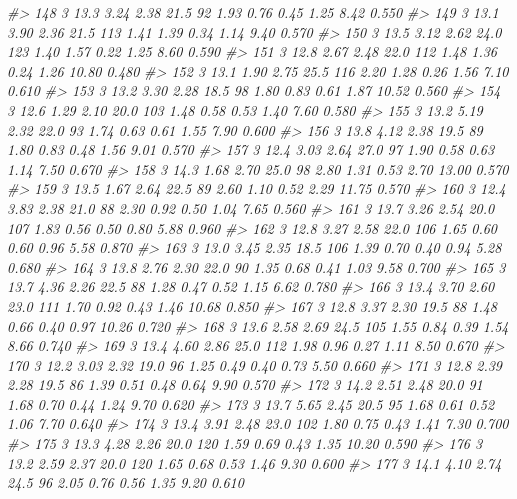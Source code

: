 \documentclass[]{book}
\newenvironment{Shaded}{\begin{snugshade}}{\end{snugshade}}
\newcommand{\CommentTok}[1]{\textcolor[rgb]{0.56,0.35,0.01}{\textit{#1}}}
\begin{document}
\begin{Shaded}
\begin{Highlighting}[]
\CommentTok{#> 148  3   13.3  3.24  2.38  21.5   92 1.93  0.76 0.45  1.25  8.42 0.550}
\CommentTok{#> 149  3   13.1  3.90  2.36  21.5  113 1.41  1.39 0.34  1.14  9.40 0.570}
\CommentTok{#> 150  3   13.5  3.12  2.62  24.0  123 1.40  1.57 0.22  1.25  8.60 0.590}
\CommentTok{#> 151  3   12.8  2.67  2.48  22.0  112 1.48  1.36 0.24  1.26 10.80 0.480}
\CommentTok{#> 152  3   13.1  1.90  2.75  25.5  116 2.20  1.28 0.26  1.56  7.10 0.610}
\CommentTok{#> 153  3   13.2  3.30  2.28  18.5   98 1.80  0.83 0.61  1.87 10.52 0.560}
\CommentTok{#> 154  3   12.6  1.29  2.10  20.0  103 1.48  0.58 0.53  1.40  7.60 0.580}
\CommentTok{#> 155  3   13.2  5.19  2.32  22.0   93 1.74  0.63 0.61  1.55  7.90 0.600}
\CommentTok{#> 156  3   13.8  4.12  2.38  19.5   89 1.80  0.83 0.48  1.56  9.01 0.570}
\CommentTok{#> 157  3   12.4  3.03  2.64  27.0   97 1.90  0.58 0.63  1.14  7.50 0.670}
\CommentTok{#> 158  3   14.3  1.68  2.70  25.0   98 2.80  1.31 0.53  2.70 13.00 0.570}
\CommentTok{#> 159  3   13.5  1.67  2.64  22.5   89 2.60  1.10 0.52  2.29 11.75 0.570}
\CommentTok{#> 160  3   12.4  3.83  2.38  21.0   88 2.30  0.92 0.50  1.04  7.65 0.560}
\CommentTok{#> 161  3   13.7  3.26  2.54  20.0  107 1.83  0.56 0.50  0.80  5.88 0.960}
\CommentTok{#> 162  3   12.8  3.27  2.58  22.0  106 1.65  0.60 0.60  0.96  5.58 0.870}
\CommentTok{#> 163  3   13.0  3.45  2.35  18.5  106 1.39  0.70 0.40  0.94  5.28 0.680}
\CommentTok{#> 164  3   13.8  2.76  2.30  22.0   90 1.35  0.68 0.41  1.03  9.58 0.700}
\CommentTok{#> 165  3   13.7  4.36  2.26  22.5   88 1.28  0.47 0.52  1.15  6.62 0.780}
\CommentTok{#> 166  3   13.4  3.70  2.60  23.0  111 1.70  0.92 0.43  1.46 10.68 0.850}
\CommentTok{#> 167  3   12.8  3.37  2.30  19.5   88 1.48  0.66 0.40  0.97 10.26 0.720}
\CommentTok{#> 168  3   13.6  2.58  2.69  24.5  105 1.55  0.84 0.39  1.54  8.66 0.740}
\CommentTok{#> 169  3   13.4  4.60  2.86  25.0  112 1.98  0.96 0.27  1.11  8.50 0.670}
\CommentTok{#> 170  3   12.2  3.03  2.32  19.0   96 1.25  0.49 0.40  0.73  5.50 0.660}
\CommentTok{#> 171  3   12.8  2.39  2.28  19.5   86 1.39  0.51 0.48  0.64  9.90 0.570}
\CommentTok{#> 172  3   14.2  2.51  2.48  20.0   91 1.68  0.70 0.44  1.24  9.70 0.620}
\CommentTok{#> 173  3   13.7  5.65  2.45  20.5   95 1.68  0.61 0.52  1.06  7.70 0.640}
\CommentTok{#> 174  3   13.4  3.91  2.48  23.0  102 1.80  0.75 0.43  1.41  7.30 0.700}
\CommentTok{#> 175  3   13.3  4.28  2.26  20.0  120 1.59  0.69 0.43  1.35 10.20 0.590}
\CommentTok{#> 176  3   13.2  2.59  2.37  20.0  120 1.65  0.68 0.53  1.46  9.30 0.600}
\CommentTok{#> 177  3   14.1  4.10  2.74  24.5   96 2.05  0.76 0.56  1.35  9.20 0.610}

\end{Highlighting}
\end{Shaded}
\end{document}
